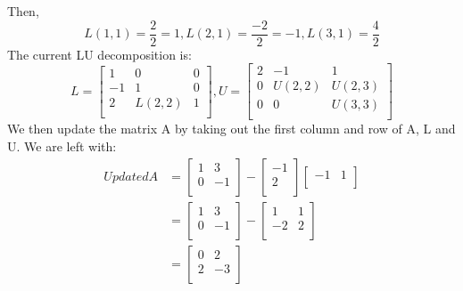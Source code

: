 \documentclass{article}
\DeclareMathOperator{\1}{\mathit{1}}
\numberwithin{figure}{section} %
\begin{document}
Then,
    \[
        L(1,1) = \frac{2}{2} = 1, L(2,1) = \frac{-2}{2} = -1, L(3,1) = \frac{4}{2}
    \]
The current LU decomposition is:
    \[
        L = 
        \begin{bmatrix}
            1 & 0 & 0 \\
            -1 & 1 & 0 \\
            2 & L(2,2) & 1 \\
        \end{bmatrix} ,
        U = 
            \begin{bmatrix}
                2 & -1 & 1 \\
                0 & U(2,2) & U(2,3) \\
                0 & 0 & U(3,3) \\
            \end{bmatrix}
    \]
We then update the matrix A by taking out the first column and row of A, L and U. We are left with:
    \[
    \begin{aligned}
        UpdatedA 
        &= 
            \begin{bmatrix}
                1 & 3 \\
                0 & -1 \\
            \end{bmatrix} - 
            \begin{bmatrix}
                -1  \\
                2  \\
            \end{bmatrix}
            \begin{bmatrix}
                -1 & 1 \\
            \end{bmatrix} \\ 
        &= 
            \begin{bmatrix}
                1 & 3 \\
                0 & -1 \\
            \end{bmatrix} - 
            \begin{bmatrix}
                1 & 1 \\
                -2 & 2 \\
            \end{bmatrix} \\
        &= 
            \begin{bmatrix}
                0 & 2 \\
                2 & -3 \\
            \end{bmatrix} 
    \end{aligned}
    \]
\end{document}
